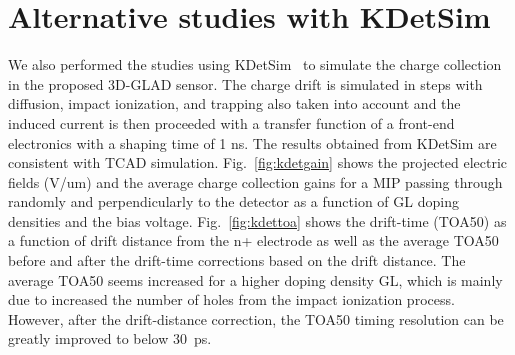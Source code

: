 \documentclass[aps,pt14,superscriptaddress,showpacs,floatfix,nofootinbib]{revtex4}
\begin{document}
\section{Alternative studies with KDetSim} 

We also performed the studies using KDetSim~\cite{kdetsim} to simulate the charge collection in the proposed 3D-GLAD sensor.
The charge drift is simulated in steps with diffusion, impact ionization, and trapping also taken into account and  
the induced current is then proceeded with a transfer function of a front-end electronics with a shaping time of 1 ns. 
The results obtained from KDetSim are consistent with TCAD simulation. Fig.~\ref{fig:kdetgain} shows the projected 
electric fields (V/um) and the average charge collection gains for a MIP passing through randomly and perpendicularly 
to the detector as a function of GL doping densities and the bias voltage. Fig.~\ref{fig:kdettoa} shows the drift-time 
(TOA50) as a function of drift distance from the n+ electrode as well as the average TOA50 before and after the drift-time corrections based on the drift distance. The average TOA50 seems increased for a higher doping density GL, which is mainly 
due to increased the number of holes from the impact ionization process. However, after the drift-distance correction, the 
TOA50 timing resolution can be greatly improved to below 30~ps.  
     
\end{document}
